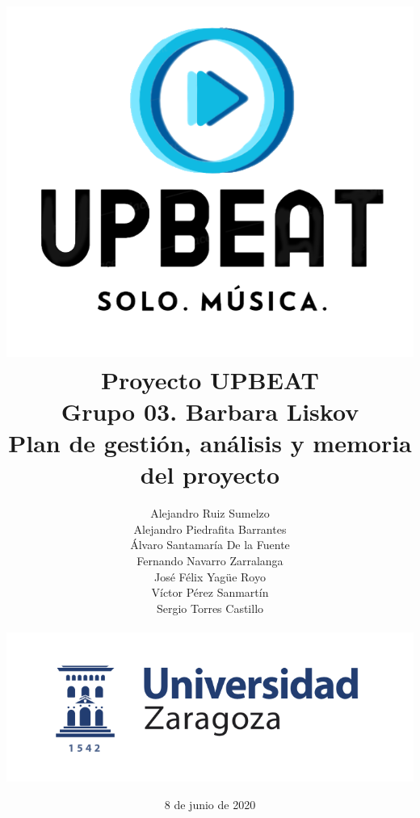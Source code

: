 \documentclass{article}
\begin{document}
\title{\includegraphics[scale=0.65]{logoDefinitivo1.png} \\ \textbf{Proyecto UPBEAT} \\ \textbf{Grupo 03. Barbara Liskov}\\Plan de gestión, análisis y memoria del proyecto \vspace{0.1cm} \\}


\author{Alejandro Ruiz Sumelzo\\
Alejandro Piedrafita Barrantes\\
Álvaro Santamaría De la Fuente\\
Fernando Navarro Zarralanga\\
José Félix Yagüe Royo\\
Víctor Pérez Sanmartín\\
Sergio Torres Castillo \vspace{0.25cm}
\\\\
\includegraphics[scale=0.5]{logoUZ.png}\\
}
\date{8 de junio de 2020}
\end{document}
